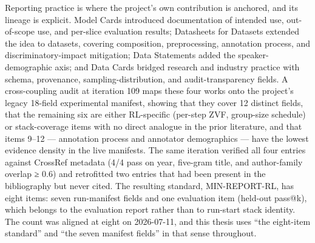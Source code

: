 \documentclass[12pt,a4paper]{report}
\begin{document}
Reporting practice is where the project's own contribution is anchored,
and its lineage is explicit. Model Cards \citep{mitchell2019modelcards}
introduced documentation of intended use, out-of-scope use, and
per-slice evaluation results; Datasheets for Datasets
\citep{gebru2021datasheets} extended the idea to datasets, covering
composition, preprocessing, annotation process, and
discriminatory-impact mitigation; Data Statements
\citep{bender2018datastatements} added the speaker-demographic axis; and
Data Cards \citep{pushkarna2022datacards} bridged research and industry
practice with schema, provenance, sampling-distribution, and
audit-transparency fields. A cross-coupling audit at iteration 109 maps
these four works onto the project's legacy 18-field experimental
manifest, showing that they cover 12 distinct fields, that the remaining
six are either RL-specific (per-step ZVF, group-size schedule) or
stack-coverage items with no direct analogue in the prior literature,
and that items 9--12 --- annotation process and annotator demographics
--- have the lowest evidence density in the live manifests. The same
iteration verified all four entries against CrossRef metadata (4/4 pass
on year, five-gram title, and author-family overlap ≥ 0.6) and
retrofitted two entries that had been present in the bibliography but
never cited. The resulting standard, MIN-REPORT-RL, has eight items:
seven run-manifest fields and one evaluation item (held-out pass@k),
which belongs to the evaluation report rather than to run-start stack
identity. The count was aligned at eight on 2026-07-11, and this thesis
uses ``the eight-item standard'' and ``the seven manifest fields'' in
that sense throughout.
\end{document}
